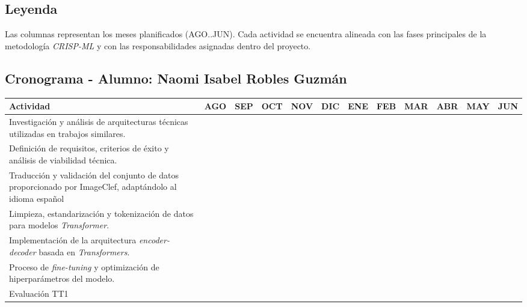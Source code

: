 \documentclass[10pt,letterpaper]{article}
\begin{document}
\subsection{Leyenda}
\noindent Las columnas representan los meses planificados (AGO..JUN). Cada actividad se encuentra alineada con las fases principales de la metodología \textit{CRISP-ML} y con las responsabilidades asignadas dentro del proyecto.

\subsection{Cronograma - Alumno: Naomi Isabel Robles Guzmán}
\begin{table}[H]
\centering\footnotesize
\begin{tabular}{|p{5.5cm}|c|c|c|c|c|c|c|c|c|c|c|}
\hline
\textbf{Actividad} & \textbf{AGO} & \textbf{SEP} & \textbf{OCT} & \textbf{NOV} & \textbf{DIC} & \textbf{ENE} & \textbf{FEB} & \textbf{MAR} & \textbf{ABR} & \textbf{MAY} & \textbf{JUN} \\ \hline

Investigación y análisis de arquitecturas técnicas utilizadas en trabajos similares. & \cellcolor{gris30} & \cellcolor{gris30} & & & & & & & & & \\ \hline

Definición de requisitos, criterios de éxito y análisis de viabilidad técnica. & \cellcolor{gris30} & \cellcolor{gris30} & & & & & & & & & \\ \hline

Traducción y validación del conjunto de datos proporcionado por ImageClef, adaptándolo al idioma español & & \cellcolor{gris30} & \cellcolor{gris30} & \cellcolor{gris30} & & & & & & & \\ \hline

Limpieza, estandarización y tokenización de datos para modelos \textit{Transformer}. & & & \cellcolor{gris30} & \cellcolor{gris30} & & & & & & & \\ \hline

Implementación de la arquitectura \textit{encoder-decoder} basada en \textit{Transformers}. & & & \cellcolor{gris30} & \cellcolor{gris30} & & & & & & & \\ \hline

Proceso de \textit{fine-tuning} y optimización de hiperparámetros del modelo. & & & & \cellcolor{gris30} & \cellcolor{gris30} & \cellcolor{gris30} & & & & & \\ \hline

Evaluación TT1 & & & & \cellcolor{gris30} & \cellcolor{gris30} & & & & & & \\ \hline


\end{tabular}
\end{table}
\end{document}
